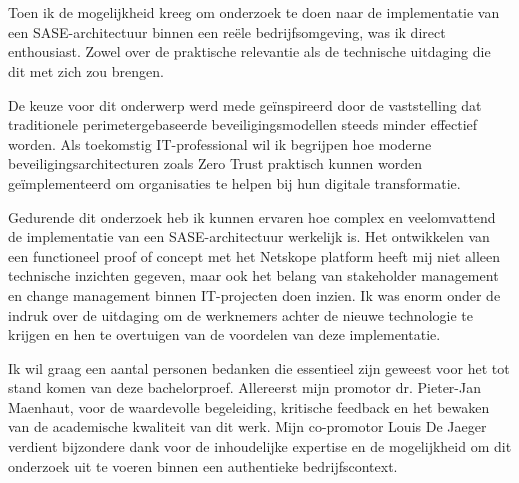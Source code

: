 
\chapter*{}%
\label{ch:voorwoord}


Toen ik de mogelijkheid kreeg om onderzoek te doen naar de implementatie van een SASE-architectuur binnen een reële bedrijfsomgeving, was ik direct enthousiast. Zowel over de praktische relevantie als de technische uitdaging die dit met zich zou brengen.

\vspace{2ex}

De keuze voor dit onderwerp werd mede geïnspireerd door de vaststelling dat traditionele perimetergebaseerde beveiligingsmodellen steeds minder effectief worden. Als toekomstig IT-professional wil ik begrijpen hoe moderne beveiligingsarchitecturen zoals Zero Trust praktisch kunnen worden geïmplementeerd om organisaties te helpen bij hun digitale transformatie.

\vspace{2ex}

Gedurende dit onderzoek heb ik kunnen ervaren hoe complex en veelomvattend de implementatie van een SASE-architectuur werkelijk is. Het ontwikkelen van een functioneel proof of concept met het Netskope platform heeft mij niet alleen technische inzichten gegeven, maar ook het belang van stakeholder management en change management binnen IT-projecten doen inzien. Ik was enorm onder de indruk over de uitdaging om de werknemers achter de nieuwe technologie te krijgen en hen te overtuigen van de voordelen van deze implementatie.

\vspace{2ex}

Ik wil graag een aantal personen bedanken die essentieel zijn geweest voor het tot stand komen van deze bachelorproef. Allereerst mijn promotor dr. Pieter-Jan Maenhaut, voor de waardevolle begeleiding, kritische feedback en het bewaken van de academische kwaliteit van dit werk. Mijn co-promotor Louis De Jaeger verdient bijzondere dank voor de inhoudelijke expertise en de mogelijkheid om dit onderzoek uit te voeren binnen een authentieke bedrijfscontext.

